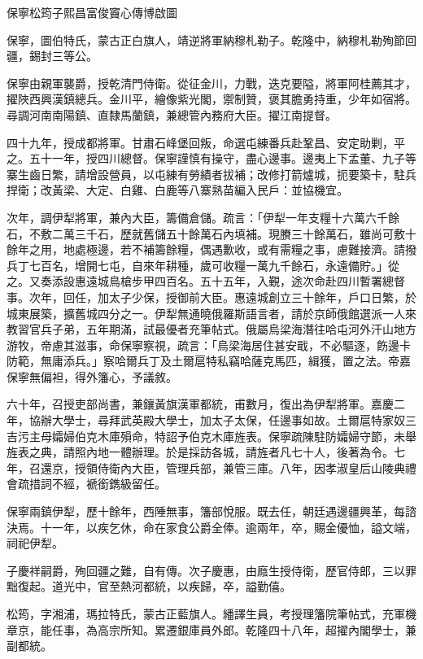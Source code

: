 
\begin{pinyinscope}
保寧松筠子熙昌富俊竇心傳博啟圖

保寧，圖伯特氏，蒙古正白旗人，靖逆將軍納穆札勒子。乾隆中，納穆札勒殉節回疆，錫封三等公。

保寧由親軍襲爵，授乾清門侍衛。從征金川，力戰，迭克要隘，將軍阿桂薦其才，擢陜西興漢鎮總兵。金川平，繪像紫光閣，禦制贊，褒其膽勇持重，少年如宿將。尋調河南南陽鎮、直隸馬蘭鎮，兼總管內務府大臣。擢江南提督。

四十九年，授成都將軍。甘肅石峰堡回叛，命選屯練番兵赴鞏昌、安定助剿，平之。五十一年，授四川總督。保寧謹慎有操守，盡心邊事。邊夷上下孟董、九子等寨生齒日繁，請增設營員，以屯練有勞績者拔補；改修打箭爐城，扼要築卡，駐兵捍衛；改黃梁、大定、白雞、白鹿等八寨熟苗編入民戶：並協機宜。

次年，調伊犁將軍，兼內大臣，籌備倉儲。疏言：「伊犁一年支糧十六萬六千餘石，不敷二萬三千石，歷就舊儲五十餘萬石內填補。現賸三十餘萬石，雖尚可敷十餘年之用，地處極邊，若不補籌餘糧，偶遇歉收，或有需糧之事，慮難接濟。請撥兵丁七百名，增開七屯，自來年耕種，歲可收糧一萬九千餘石，永遠備貯。」從之。又奏添設惠遠城鳥槍步甲四百名。五十五年，入覲，途次命赴四川暫署總督事。次年，回任，加太子少保，授御前大臣。惠遠城創立三十餘年，戶口日繁，於城東展築，擴舊城四分之一。伊犁無通曉俄羅斯語言者，請於京師俄館選派一人來教習官兵子弟，五年期滿，試最優者充筆帖式。俄屬烏梁海潛往哈屯河外汗山地方游牧，帝慮其滋事，命保寧察視，疏言：「烏梁海居住甚安戢，不必驅逐，飭邊卡防範，無庸添兵。」察哈爾兵丁及土爾扈特私竊哈薩克馬匹，緝獲，置之法。帝嘉保寧無偏袒，得外籓心，予議敘。

六十年，召授吏部尚書，兼鑲黃旗漢軍都統，甫數月，復出為伊犁將軍。嘉慶二年，協辦大學士，尋拜武英殿大學士，加太子太保，任邊事如故。土爾扈特家奴三吉污主母孀婦伯克木庫殞命，特詔予伯克木庫旌表。保寧疏陳駐防孀婦守節，未舉旌表之典，請照內地一體辦理。於是採訪各城，請旌者凡七十人，後著為令。七年，召還京，授領侍衛內大臣，管理兵部，兼管三庫。八年，因孝淑皇后山陵典禮會疏措詞不經，褫銜鐫級留任。

保寧兩鎮伊犁，歷十餘年，西陲無事，籓部悅服。既去任，朝廷遇邊疆興革，每諮決焉。十一年，以疾乞休，命在家食公爵全俸。逾兩年，卒，賜金優恤，謚文端，祠祀伊犁。

子慶祥嗣爵，殉回疆之難，自有傳。次子慶惠，由廕生授侍衛，歷官侍郎，三以罪黜復起。道光中，官至熱河都統，以疾歸，卒，謚勤僖。

松筠，字湘浦，瑪拉特氏，蒙古正藍旗人。繙譯生員，考授理籓院筆帖式，充軍機章京，能任事，為高宗所知。累遷銀庫員外郎。乾隆四十八年，超擢內閣學士，兼副都統。


\end{pinyinscope}
